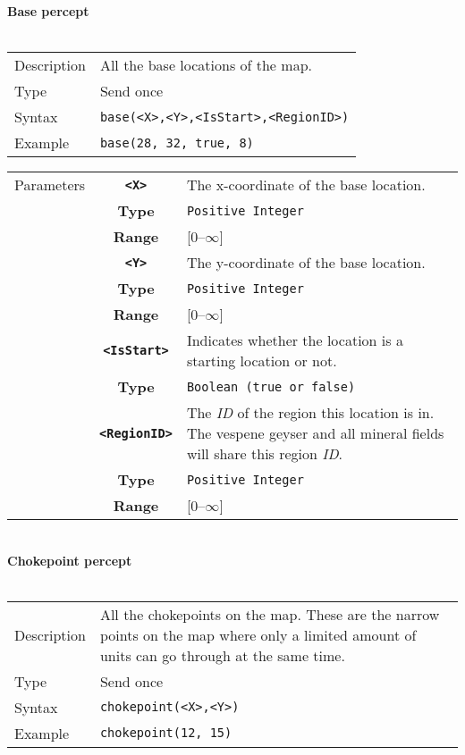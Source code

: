 \noindent
\textbf{Base percept}\\
\\
\begin{tabularx}{\textwidth}{lX}
 Description & All the base locations of the map. \\
 Type & Send once \\
 Syntax & \verb|base(<X>,<Y>,<IsStart>,<RegionID>)| \\
 Example & \verb|base(28, 32, true, 8)| \\  
 \end{tabularx}
 \begin{tabularx}{\textwidth}{l | c | p{8cm}|}
 \cline{2-3} 
 Parameters & \textbf{\verb|<X>|} & The x-coordinate of the base location.\\
            & \textbf{Type} & \verb|Positive Integer| \\
            & \textbf{Range} & [0--$\infty$] \\
            \cline{2-3} 
            & \textbf{\verb|<Y>|} & The y-coordinate of the base location.\\
            & \textbf{Type} & \verb|Positive Integer| \\
            & \textbf{Range} & [0--$\infty$] \\
            \cline{2-3} 
            & \textbf{\verb|<IsStart>|} & Indicates whether the location is a starting location or not. \\
            & \textbf{Type} & \verb|Boolean (true or false)| \\
            \cline{2-3} 
            & \textbf{\verb|<RegionID>|} & The \textit{ID} of the region this location is in. The vespene geyser and all mineral fields will share this region \textit{ID}. \\
            & \textbf{Type} & \verb|Positive Integer| \\
            & \textbf{Range} & [0--$\infty$] \\
            \cline{2-3} 
\end{tabularx}\\
\newpage
\noindent
\textbf{Chokepoint percept}\\
\\
\begin{tabularx}{\textwidth}{lX}
 Description & All the chokepoints on the map. These are the narrow points on the map where only a limited amount of units can go through at the same time.  \\
 Type & Send once \\
 Syntax & \verb|chokepoint(<X>,<Y>)| \\
 Example & \verb|chokepoint(12, 15)| \\ 
 \end{tabularx}
